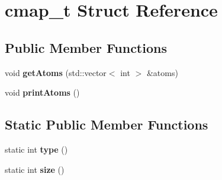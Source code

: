\hypertarget{structcmap__t}{}\section{cmap\+\_\+t Struct Reference}
\label{structcmap__t}
\subsection*{Public Member Functions}
\begin{DoxyCompactItemize}
\item 
\hypertarget{structcmap__t_a1170ae65a8b03b665eb0b10930f048b9}{}\label{structcmap__t_a1170ae65a8b03b665eb0b10930f048b9} 
void {\bfseries get\+Atoms} (std\+::vector$<$ int $>$ \&atoms)
\item 
\hypertarget{structcmap__t_a326afc24955a7f1acbf98fb02b1fc39d}{}\label{structcmap__t_a326afc24955a7f1acbf98fb02b1fc39d} 
void {\bfseries print\+Atoms} ()
\end{DoxyCompactItemize}
\subsection*{Static Public Member Functions}
\begin{DoxyCompactItemize}
\item 
\hypertarget{structcmap__t_afabee9137cbc9a95fbaf62dc4d6917fd}{}\label{structcmap__t_afabee9137cbc9a95fbaf62dc4d6917fd} 
static int {\bfseries type} ()
\item 
\hypertarget{structcmap__t_a9a7b422cc29ad9625cf61b5842f453eb}{}\label{structcmap__t_a9a7b422cc29ad9625cf61b5842f453eb} 
static int {\bfseries size} ()
\end{DoxyCompactItemize}

